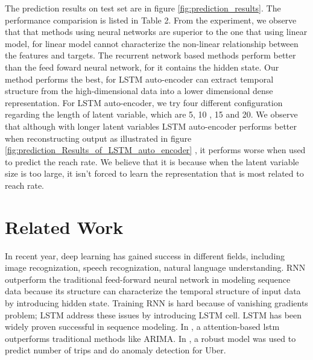 \documentclass[5p]{elsarticle}
\newcommand{\dabiaolv}{reach rate}
\begin{document}
The prediction results on test set are in figure \ref{fig:prediction_results}. The performance comparision is listed in Table 2. From the experiment, we observe that that methods using neural networks are superior to the one that using linear model, for linear model cannot characterize the non-linear relationship between the features and targets. The recurrent network based methods perform better than the feed foward neural network, for it contains the hidden state. Our method performs the best, for LSTM auto-encoder can extract temporal structure from the high-dimensional data into a lower dimensional dense representation. For LSTM auto-encoder, we try four different configuration regarding the length of latent variable, which are 5, 10 , 15 and 20. We observe that although with longer latent variables LSTM auto-encoder performs better when reconstructing output as illustrated in figure \ref{fig:prediction_Results_of_LSTM_auto_encoder} , it performs worse when used to predict the \dabiaolv . We believe that it is because when the latent variable size is too large, it isn't forced to learn the representation that is most related to \dabiaolv.     
 
\section{Related Work}
In recent year, deep learning has gained success in different fields, including image recognization, speech recognization, natural language understanding\cite{Lecun2015}. RNN\cite{Schmidhuber1989} outperform the traditional feed-forward neural network in modeling sequence data because its structure can characterize the temporal structure of input data by introducing hidden state. Training RNN is hard because of vanishing gradients problem; LSTM address these issues by introducing LSTM cell\cite{Hochreiter1997LongMemory}. LSTM has been widely proven successful in sequence modeling. In \cite{Qin}, a attention-based lstm outperforms traditional methods like ARIMA. In \cite{Zhu2017DeepUber}, a robust model was used to predict number of trips and do anomaly detection for Uber. 
\end{document}
